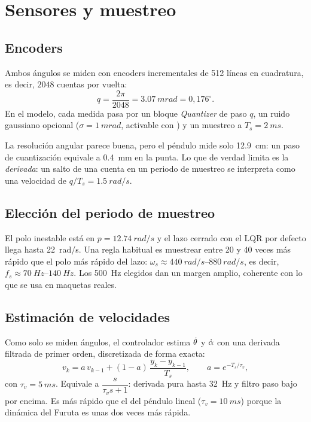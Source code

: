 \chapter{Sensores y muestreo}
\label{cap:sensores}

\section{Encoders}

Ambos ángulos se miden con encoders incrementales de 512 líneas en cuadratura, es decir, $2048$ cuentas por vuelta:
\begin{equation}
  q = \frac{2\pi}{2048} = \SI{3.07}{mrad} = 0{,}176^\circ .
\end{equation}
En el modelo, cada medida pasa por un bloque \emph{Quantizer} de paso $q$, un ruido gaussiano opcional ($\sigma=\SI{1}{mrad}$, activable con ) y un muestreo a $T_s=\SI{2}{ms}$.

\begin{nota}
La resolución angular parece buena, pero el péndulo mide solo \SI{12.9}{cm}: un paso de cuantización equivale a \SI{0.4}{mm} en la punta. Lo que de verdad limita es la \emph{derivada}: un salto de una cuenta en un periodo de muestreo se interpreta como una velocidad de $q/T_s=\SI{1.5}{rad/s}$.
\end{nota}

\section{Elección del periodo de muestreo}

El polo inestable está en $p=\SI{12.74}{rad/s}$ y el lazo cerrado con el LQR por defecto llega hasta \SI{22}{rad/s}. Una regla habitual es muestrear entre 20 y 40 veces más rápido que el polo más rápido del lazo: $\omega_s\approx\SIrange{440}{880}{rad/s}$, es decir, $f_s\approx\SIrange{70}{140}{Hz}$. Los \SI{500}{Hz} elegidos dan un margen amplio, coherente con lo que se usa en maquetas reales.

\section{Estimación de velocidades}

Como solo se miden ángulos, el controlador estima $\dot{\theta}$ y $\dot{\alpha}$ con una derivada filtrada de primer orden, discretizada de forma exacta:
\begin{equation}
  v_k = a\,v_{k-1} + (1-a)\,\frac{y_k-y_{k-1}}{T_s},\qquad a = e^{-T_s/\tau_v},
\end{equation}
con $\tau_v=\SI{5}{ms}$. Equivale a $\dfrac{s}{\tau_vs+1}$: derivada pura hasta \SI{32}{Hz} y filtro paso bajo por encima. Es más rápido que el del péndulo lineal ($\tau_v=\SI{10}{ms}$) porque la dinámica del Furuta es unas dos veces más rápida.

